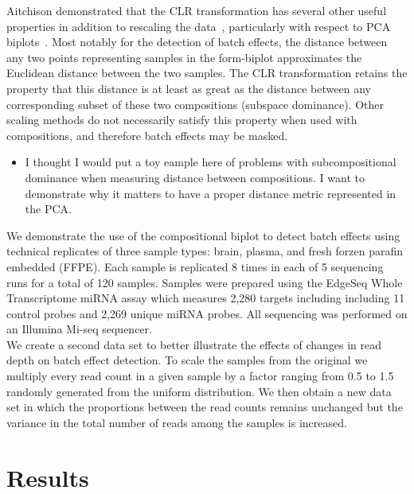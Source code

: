 \documentclass{article}\usepackage[]{graphicx}\usepackage[]{color}
\theoremstyle{definition}
\begin{document}
Aitchison demonstrated that the CLR transformation has several other useful properties in addition to rescaling the data~\cite{Aitchison1986}, particularly with respect to PCA biplots~\cite{Aitchison2002}.  Most notably for the detection of batch effects, the distance between any two points representing samples in the form-biplot approximates the Euclidean distance between the two samples.  The CLR transformation retains the property that this distance is at least as great as the distance between any corresponding subset of these two compositions (subspace dominance).  Other scaling methods do not necessarily satisfy this property when used with compositions, and therefore batch effects may be masked.\\

\begin{itemize}
\item I thought I would put a toy eample here of problems with subcompositional dominance when measuring distance between compositions.  I want to demonstrate why it matters to have a proper distance metric represented in the PCA.
\end{itemize}


We demonstrate the use of the compositional biplot to detect batch effects using technical replicates of three sample types: brain, plasma, and fresh forzen parafin embedded (FFPE).  Each sample is replicated 8 times in each of 5 sequencing runs for a total of 120 samples.  Samples were prepared using the EdgeSeq Whole Transcriptome miRNA assay which measures 2,280 targets including including 11 control probes and 2,269 unique miRNA probes.  All sequencing was performed on an Illumina Mi-seq sequencer.\\

We create a second data set to better illustrate the effects of changes in read depth on batch effect detection.  To scale the samples from the original we multiply every read count in a given sample by a factor ranging from 0.5 to 1.5 randomly generated from the uniform distribution.  We then obtain a new data set in which the proportions between the read counts remains unchanged but the variance in the total number of reads among the samples is increased.\\ 

\section{Results}
\end{document}
